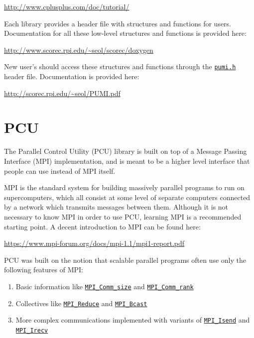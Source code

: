 \documentclass{article}
\begin{document}
\url{http://www.cplusplus.com/doc/tutorial/}

Each library provides a header file with structures
and functions for users.
Documentation for all these low-level structures and
functions is provided here:

\url{http://www.scorec.rpi.edu/~seol/scorec/doxygen}

New user's should access these structures and functions through the
\href{https://github.com/SCOREC/core/blob/master/pumi/pumi.h}
{\texttt{pumi.h}} header file.
Documentation is provided here:

\url{http://scorec.rpi.edu/~seol/PUMI.pdf}

\section{PCU}
\label{sec:pcu}

The Parallel Control Utility (PCU) library is built
on top of a Message Passing Interface (MPI) implementation,
and is meant to be a higher level interface that people
can use instead of MPI itself.

MPI is the standard system for building massively parallel
programs to run on supercomputers, which all consist
at some level of separate computers connected by a
network which transmits messages between them.
Although it is not necessary to know MPI in order to use
PCU, learning MPI is a recommended starting point.
A decent introduction to MPI can be found here:

\url{https://www.mpi-forum.org/docs/mpi-1.1/mpi1-report.pdf}

PCU was built on the notion that scalable parallel
programs often use only the following features of MPI:

\begin{enumerate}
\item Basic information like
\href{http://www.mpich.org/static/docs/v3.1/www3/MPI_Comm_size.html}{\texttt{MPI\_Comm\_size}}
and
\href{http://www.mpich.org/static/docs/v3.1/www3/MPI_Comm_rank.html}{\texttt{MPI\_Comm\_rank}}
\item Collectives like
\href{http://www.mpich.org/static/docs/v3.1/www3/MPI_Reduce.html}{\texttt{MPI\_Reduce}}
and
\href{http://www.mpich.org/static/docs/v3.1/www3/MPI_Bcast.html}{\texttt{MPI\_Bcast}}
\item \label{it:nonblock} More complex communications implemented with variants of
\href{http://www.mpich.org/static/docs/v3.1/www3/MPI_Isend.html}{\texttt{MPI\_Isend}}
and
\href{http://www.mpich.org/static/docs/v3.1/www3/MPI_Irecv.html}{\texttt{MPI\_Irecv}}
\end{enumerate}
\end{document}
